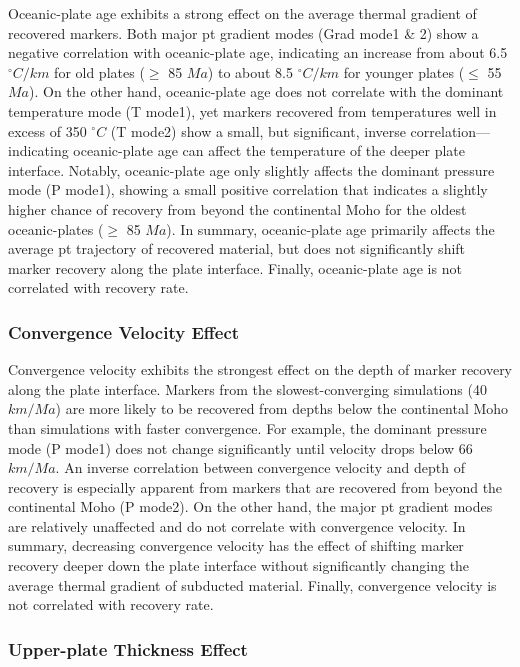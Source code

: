 Oceanic-plate age exhibits a strong effect on the average thermal gradient of recovered markers. Both major \gls{pt} gradient modes (Grad mode1 \& 2) show a negative correlation with oceanic-plate age, indicating an increase from about 6.5 \(^\circ C/km\) for old plates (\(\geq\) 85 \(Ma\)) to about 8.5 \(^\circ C/km\) for younger plates (\(\leq\) 55 \(Ma\)). On the other hand, oceanic-plate age does not correlate with the dominant temperature mode (T mode1), yet markers recovered from temperatures well in excess of 350 \(^\circ C\) (T mode2) show a small, but significant, inverse correlation---indicating oceanic-plate age can affect the temperature of the deeper plate interface. Notably, oceanic-plate age only slightly affects the dominant pressure mode (P mode1), showing a small positive correlation that indicates a slightly higher chance of recovery from beyond the continental Moho for the oldest oceanic-plates (\(\geq\) 85 \(Ma\)). In summary, oceanic-plate age primarily affects the average \gls{pt} trajectory of recovered material, but does not significantly shift marker recovery along the plate interface. Finally, oceanic-plate age is not correlated with recovery rate.

\hypertarget{convergence-velocity-effect}{%
\subsubsection{Convergence Velocity Effect}\label{convergence-velocity-effect}}

Convergence velocity exhibits the strongest effect on the depth of marker recovery along the plate interface. Markers from the slowest-converging simulations (40 \(km/Ma\)) are more likely to be recovered from depths below the continental Moho than simulations with faster convergence. For example, the dominant pressure mode (P mode1) does not change significantly until velocity drops below 66 \(km/Ma\). An inverse correlation between convergence velocity and depth of recovery is especially apparent from markers that are recovered from beyond the continental Moho (P mode2). On the other hand, the major \gls{pt} gradient modes are relatively unaffected and do not correlate with convergence velocity. In summary, decreasing convergence velocity has the effect of shifting marker recovery deeper down the plate interface without significantly changing the average thermal gradient of subducted material. Finally, convergence velocity is not correlated with recovery rate.

\hypertarget{upper-plate-thickness-effect}{%
\subsubsection{Upper-plate Thickness Effect}\label{upper-plate-thickness-effect}}

